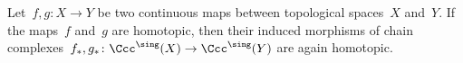\begin{remark}
%   
\end{remark}


\begin{example}
  Let~$f, g \colon X \to Y$ be two continuous maps between topological spaces~$X$ and~$Y$.
  If the maps~$f$ and~$g$ are homotopic, then their induced morphisms of chain complexes~$f_*, g_* \colon \Ccc^\sing(X) \to \Ccc^\sing(Y)$ are again homotopic.
\end{example}


